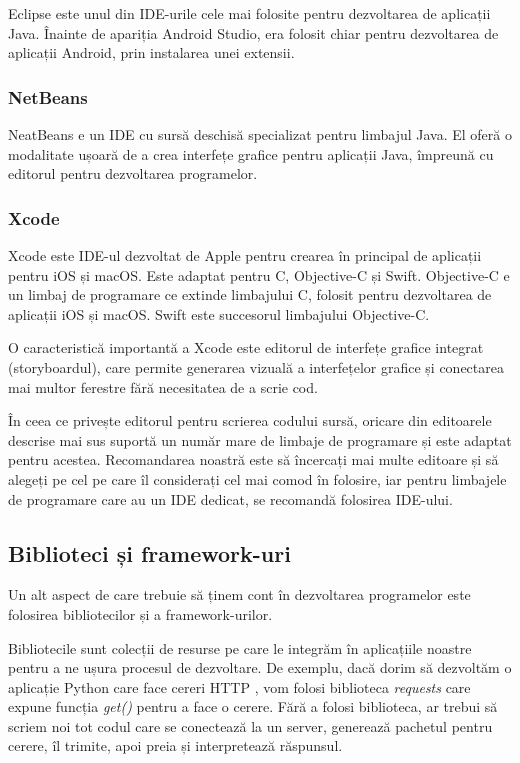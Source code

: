 Eclipse este unul din IDE-urile cele mai folosite pentru dezvoltarea de
aplicații Java. Înainte de apariția Android Studio, era folosit chiar pentru
dezvoltarea de aplicații Android, prin instalarea unei extensii.

\subsubsection{NetBeans}
\label{sec:appdev:dev:ide:netbeans}

NeatBeans e un IDE cu sursă deschisă specializat pentru limbajul Java. El oferă
o modalitate ușoară de a crea interfețe grafice pentru aplicații Java, împreună
cu editorul pentru dezvoltarea programelor.

\subsubsection{Xcode}
\label{sec:appdev:dev:ide:xcode}

Xcode este IDE-ul dezvoltat de Apple pentru crearea în principal de aplicații
pentru iOS și macOS. Este adaptat pentru C, Objective-C și Swift. Objective-C e
un limbaj de programare ce extinde limbajului C, folosit pentru dezvoltarea de
aplicații iOS și macOS. Swift este succesorul limbajului Objective-C.

O caracteristică importantă a Xcode este editorul de interfețe grafice integrat
(storyboardul), care permite generarea vizuală a interfețelor grafice și
conectarea mai multor ferestre fără necesitatea de a scrie cod.

În ceea ce privește editorul pentru scrierea codului sursă, oricare din
editoarele descrise mai sus suportă un număr mare de limbaje de programare și
este adaptat pentru acestea. Recomandarea noastră este să încercați mai multe
editoare și să alegeți pe cel pe care îl considerați cel mai comod în folosire,
iar pentru limbajele de programare care au un IDE dedicat, se recomandă
folosirea IDE-ului.

\subsection{Biblioteci și framework-uri}
\label{sec:appdev:dev:libs}

Un alt aspect de care trebuie să ținem cont în dezvoltarea programelor este
folosirea bibliotecilor și a framework-urilor.

Bibliotecile sunt colecții de resurse pe care le integrăm în aplicațiile noastre
pentru a ne ușura procesul de dezvoltare. De exemplu, dacă dorim să dezvoltăm o
aplicație Python care face cereri HTTP , vom folosi biblioteca \textit{requests} care expune funcția
\textit{get()} pentru a face o cerere. Fără a folosi biblioteca, ar trebui să
scriem noi tot codul care se conectează la un server, generează pachetul pentru
cerere, îl trimite, apoi preia și interpretează răspunsul.

